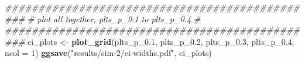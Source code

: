 \documentclass[
]{article}
\newenvironment{Shaded}{\begin{snugshade}}{\end{snugshade}}
\newcommand{\CommentTok}[1]{\textcolor[rgb]{0.56,0.35,0.01}{\textit{#1}}}
\newcommand{\DataTypeTok}[1]{\textcolor[rgb]{0.13,0.29,0.53}{#1}}
\newcommand{\DecValTok}[1]{\textcolor[rgb]{0.00,0.00,0.81}{#1}}
\newcommand{\FloatTok}[1]{\textcolor[rgb]{0.00,0.00,0.81}{#1}}
\newcommand{\KeywordTok}[1]{\textcolor[rgb]{0.13,0.29,0.53}{\textbf{#1}}}
\newcommand{\NormalTok}[1]{#1}
\newcommand{\StringTok}[1]{\textcolor[rgb]{0.31,0.60,0.02}{#1}}
\begin{document}
\begin{Shaded}
\begin{Highlighting}[]
\CommentTok{\#\#\#\#\#\#\#\#\#\#\#\#\#\#\#\#\#\#\#\#\#\#\#\#\#\#\#\#\#\#\#\#\#\#\#\#\#\#\#\#\#\#\#\#\#\#\#}
\CommentTok{\# plot all together, plts\_p\_0.1 to plts\_p\_0.4 \#}
\CommentTok{\#\#\#\#\#\#\#\#\#\#\#\#\#\#\#\#\#\#\#\#\#\#\#\#\#\#\#\#\#\#\#\#\#\#\#\#\#\#\#\#\#\#\#\#\#\#\#}
\NormalTok{ci\_plots \textless{}{-}}\StringTok{ }\KeywordTok{plot\_grid}\NormalTok{(plts\_p\_}\FloatTok{0.1}\NormalTok{, plts\_p\_}\FloatTok{0.2}\NormalTok{, plts\_p\_}\FloatTok{0.3}\NormalTok{, plts\_p\_}\FloatTok{0.4}\NormalTok{, }\DataTypeTok{ncol =} \DecValTok{1}\NormalTok{)}
\KeywordTok{ggsave}\NormalTok{(}\StringTok{"results/sim{-}2/ci{-}widths.pdf"}\NormalTok{, ci\_plots)}
\end{Highlighting}
\end{Shaded}
\end{document}
